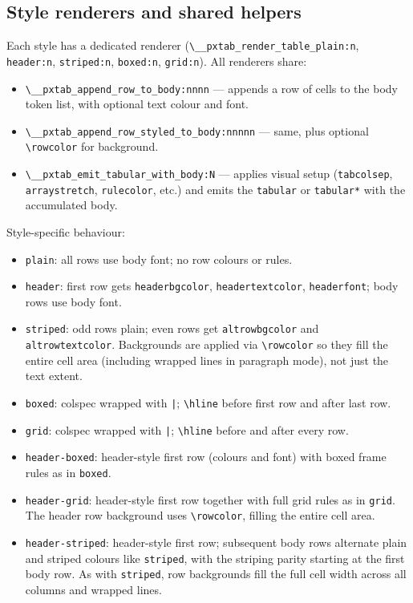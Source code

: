 \documentclass[11pt,a4paper]{article}
\begin{document}
\subsection*{Style renderers and shared helpers}

Each style has a dedicated renderer
(\verb|\__pxtab_render_table_plain:n|, \verb|header:n|,
\verb|striped:n|, \verb|boxed:n|, \verb|grid:n|).  All renderers share:

\begin{itemize}
  \item \verb|\__pxtab_append_row_to_body:nnnn| --- appends a row of
    cells to the body token list, with optional text colour and font.
  \item \verb|\__pxtab_append_row_styled_to_body:nnnnn| --- same, plus
    optional \verb|\rowcolor| for background.
  \item \verb|\__pxtab_emit_tabular_with_body:N| --- applies visual
    setup (\texttt{tabcolsep}, \texttt{arraystretch}, \texttt{rulecolor},
    etc.) and emits the \texttt{tabular} or \texttt{tabular*} with the
    accumulated body.
\end{itemize}

Style-specific behaviour:
\begin{itemize}
  \item \texttt{plain}: all rows use body font; no row colours or rules.
  \item \texttt{header}: first row gets \texttt{headerbgcolor},
    \texttt{headertextcolor}, \texttt{headerfont}; body rows use body font.
  \item \texttt{striped}: odd rows plain; even rows get
    \texttt{altrowbgcolor} and \texttt{altrowtextcolor}.
    Backgrounds are applied via \verb|\rowcolor| so they fill the
    entire cell area (including wrapped lines in paragraph mode),
    not just the text extent.
  \item \texttt{boxed}: colspec wrapped with \texttt{|}; \texttt{\textbackslash hline}
    before first row and after last row.
  \item \texttt{grid}: colspec wrapped with \texttt{|}; \texttt{\textbackslash hline}
    before and after every row.
  \item \texttt{header-boxed}: header-style first row (colours and font)
    with boxed frame rules as in \texttt{boxed}.
  \item \texttt{header-grid}: header-style first row together with full
    grid rules as in \texttt{grid}.  The header row background
    uses \verb|\rowcolor|, filling the entire cell area.
  \item \texttt{header-striped}: header-style first row; subsequent body
    rows alternate plain and striped colours like \texttt{striped}, with
    the striping parity starting at the first body row.  As with
    \texttt{striped}, row backgrounds fill the full cell width across
    all columns and wrapped lines.
\end{itemize}
\end{document}
